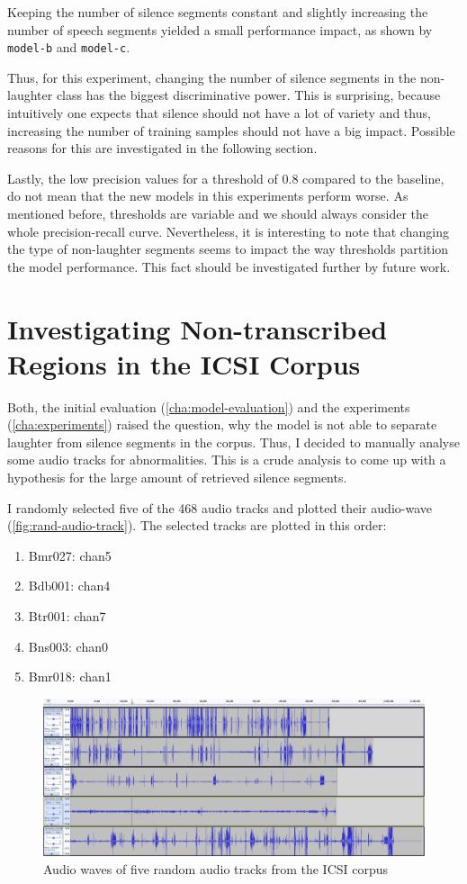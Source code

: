 \documentclass[bsc,frontabs,parskip,deptreport]{infthesis}
\begin{document}
Keeping the number of silence segments constant and slightly increasing the number of speech segments yielded a small performance impact, as shown by \texttt{model-b} and \texttt{model-c}.

Thus, for this experiment, changing the number of silence segments in the non-laughter class has the biggest discriminative power. This is surprising, because intuitively one expects that silence should not have a lot of variety and thus, increasing the number of training samples should not have a big impact. Possible reasons for this are investigated in the following section.

Lastly, the low precision values for a threshold of 0.8 compared to the baseline, do not mean that the new models in this experiments perform worse. As mentioned before, thresholds are variable and we should always consider the whole precision-recall curve. Nevertheless, it is interesting to note that changing the type of non-laughter segments seems to impact the way thresholds partition the model performance. This fact should be investigated further by future work.

\section{Investigating Non-transcribed Regions in the ICSI Corpus} \label{sec:silence-regions}
Both, the initial evaluation (\autoref{cha:model-evaluation}) and the experiments (\autoref{cha:experiments}) raised the question, why the model is not able to separate laughter from silence segments in the corpus. Thus, I decided to manually analyse some audio tracks for abnormalities. This is a crude analysis to come up with a hypothesis for the large amount of retrieved silence segments.

I randomly selected five of the 468 audio tracks and plotted their audio-wave (\autoref{fig:rand-audio-track}). The selected tracks are plotted in this order:
\begin{enumerate}
    \item Bmr027: chan5
    \item Bdb001: chan4
    \item Btr001: chan7
    \item Bns003: chan0
    \item Bmr018: chan1
\end{enumerate}

\begin{figure}[h!]
    \centering
    \includegraphics[width=14cm]{imgs/audio_waves/plotted_audio_waves.png}
    \caption{Audio waves of five random audio tracks from the ICSI corpus}
    \label{fig:rand-audio-track}
\end{figure}
\end{document}
